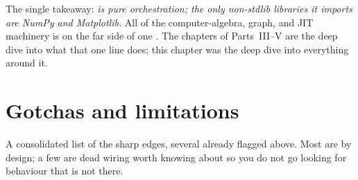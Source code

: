 The single takeaway: \emph{ is pure orchestration; the only
non-stdlib libraries it imports are NumPy and Matplotlib.} All of the
computer-algebra, graph, and JIT machinery is on the far side of one
. The chapters of Parts~III--V are
the deep dive into what that one line does; this chapter was the deep dive into
everything around it.

\section{Gotchas and limitations}\label{sec:gotchas}

A consolidated list of the sharp edges, several already flagged above. Most are by
design; a few are dead wiring worth knowing about so you do not go looking for
behaviour that is not there.

